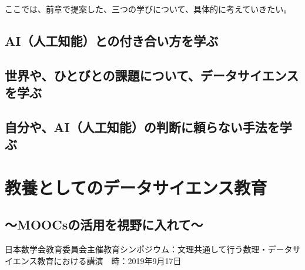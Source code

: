 \documentclass[
]{book}
\theoremstyle{definition}
\theoremstyle{definition}
\theoremstyle{definition}
\theoremstyle{definition}
\theoremstyle{remark}
\begin{document}
ここでは、前章で提案した、三つの学びについて、具体的に考えていきたい。

\hypertarget{aiux4ebaux5de5ux77e5ux80fdux3068ux306eux4ed8ux304dux5408ux3044ux65b9ux3092ux5b66ux3076-1}{%
\section{AI（人工知能）との付き合い方を学ぶ}\label{aiux4ebaux5de5ux77e5ux80fdux3068ux306eux4ed8ux304dux5408ux3044ux65b9ux3092ux5b66ux3076-1}}

\hypertarget{ux4e16ux754cux3084ux3072ux3068ux3073ux3068ux306eux8ab2ux984cux306bux3064ux3044ux3066ux30c7ux30fcux30bfux30b5ux30a4ux30a8ux30f3ux30b9ux3092ux5b66ux3076-1}{%
\section{世界や、ひとびとの課題について、データサイエンスを学ぶ}\label{ux4e16ux754cux3084ux3072ux3068ux3073ux3068ux306eux8ab2ux984cux306bux3064ux3044ux3066ux30c7ux30fcux30bfux30b5ux30a4ux30a8ux30f3ux30b9ux3092ux5b66ux3076-1}}

\hypertarget{ux81eaux5206ux3084aiux4ebaux5de5ux77e5ux80fdux306eux5224ux65adux306bux983cux3089ux306aux3044ux624bux6cd5ux3092ux5b66ux3076-1}{%
\section{自分や、AI（人工知能）の判断に頼らない手法を学ぶ}\label{ux81eaux5206ux3084aiux4ebaux5de5ux77e5ux80fdux306eux5224ux65adux306bux983cux3089ux306aux3044ux624bux6cd5ux3092ux5b66ux3076-1}}

\hypertarget{appendix-appendix}{%
\appendix}


\hypertarget{math2019}{%
\chapter{教養としてのデータサイエンス教育}\label{math2019}}

\hypertarget{moocsux306eux6d3bux7528ux3092ux8996ux91ceux306bux5165ux308cux3066}{%
\section*{～MOOCsの活用を視野に入れて～}\label{moocsux306eux6d3bux7528ux3092ux8996ux91ceux306bux5165ux308cux3066}}

日本数学会教育委員会主催教育シンポジウム：文理共通して行う数理・データサイエンス教育における講演　時：2019年9月17日
\end{document}
